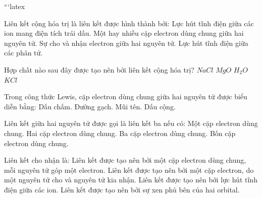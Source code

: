 ```latex
\begin{ex}
Liên kết cộng hóa trị là liên kết được hình thành bởi:
    \choice
    {Lực hút tĩnh điện giữa các ion mang điện tích trái dấu.}
    {\True Một hay nhiều cặp electron dùng chung giữa hai nguyên tử.}
    {Sự cho và nhận electron giữa hai nguyên tử.}
    {Lực hút tĩnh điện giữa các phân tử.}
\end{ex}

\begin{ex}
Hợp chất nào sau đây được tạo nên bởi liên kết cộng hóa trị?
    \choice
    {$NaCl$}
    {$MgO$}
    {\True $H_2O$}
    {$KCl$}
\end{ex}

\begin{ex}
Trong công thức Lewis, cặp electron dùng chung giữa hai nguyên tử được biểu diễn bằng:
    \choice
    {Dấu chấm.}
    {\True Đường gạch.}
    {Mũi tên.}
    {Dấu cộng.}
\end{ex}

\begin{ex}
Liên kết giữa hai nguyên tử được gọi là liên kết ba nếu có:
    \choice
    {Một cặp electron dùng chung.}
    {Hai cặp electron dùng chung.}
    {\True Ba cặp electron dùng chung.}
    {Bốn cặp electron dùng chung.}
\end{ex}

\begin{ex}
Liên kết cho nhận là:
    \choice
    {Liên kết được tạo nên bởi một cặp electron dùng chung, mỗi nguyên tử góp một electron.}
    {\True Liên kết được tạo nên bởi một cặp electron, do một nguyên tử cho và nguyên tử kia nhận.}
    {Liên kết được tạo nên bởi lực hút tĩnh điện giữa các ion.}
    {Liên kết được tạo nên bởi sự xen phủ bên của hai orbital.}
\end{ex}

